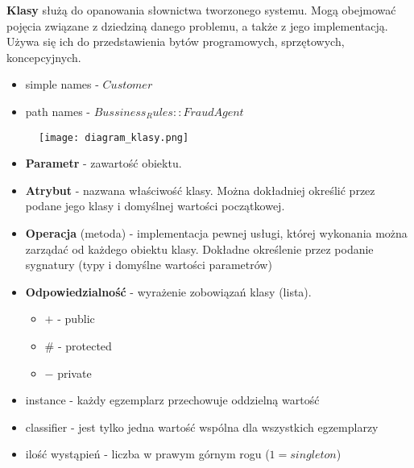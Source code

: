\documentclass[a4paper]{article}
\begin{document}
\textbf{Klasy} służą do opanowania słownictwa tworzonego systemu. Mogą obejmować pojęcia związane z dziedziną danego
problemu, a także z jego implementacją. Używa się ich
do przedstawienia bytów programowych, sprzętowych,
koncepcyjnych.
\begin{itemize}
    \item simple names - $Customer$
    \item path names - $Bussiness_Rules::FraudAgent$
\end{itemize}

\begin{figure}[!h]
\texttt{[image: diagram\_klasy.png]}
\end{figure}

    \begin{itemize}
        \item \textbf{Parametr} - zawartość obiektu.
        \item \textbf{Atrybut} - nazwana właściwość klasy. Można dokładniej określić przez podane jego
        klasy i domyślnej wartości początkowej.
        \item \textbf{Operacja} (metoda) - implementacja pewnej usługi, której wykonania można zarządać
        od każdego obiektu klasy. Dokładne określenie przez podanie sygnatury (typy i domyślne wartości parametrów)
        \item \textbf{Odpowiedzialność} - wyrażenie zobowiązań klasy (lista).\\

        \begin{itemize}
            \item $+$ - public
            \item \# - protected
            \item $-$ private
        \end{itemize}
        \item instance - każdy egzemplarz przechowuje oddzielną wartość
        \item classifier - jest tylko jedna wartość wspólna dla wszystkich egzemplarzy
        \item ilość wystąpień - liczba w prawym górnym rogu ($1 = singleton$)
    \end{itemize}
\end{document}
